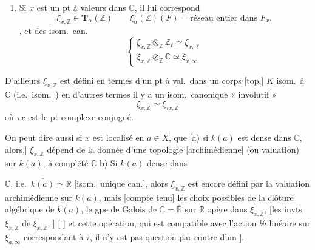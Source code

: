 \documentclass[11pt,a4paper]{article}
\begin{document}
\begin{enumerate}
  \item[(iv)] Si $x$ est un pt à valeurs dans $\mathbb{C}$, il lui
  correspond
  \[
    \xi_{x,\mathbb{Z}} \in \mathbf{T}_\alpha(\mathbb{Z}) \qquad
    \xi_\alpha(\mathbb{Z})(F) = \text{réseau entier dans } F_x ,
  \]
   
  , et des isom.\ can.
  \[
    \begin{cases}
      \xi_{x,\mathbb{Z}} \otimes_{\mathbb{Z}} \mathbb{Z}_\ell \simeq
      \xi_{x,\ell} \\
      \xi_{x,\mathbb{Z}} \otimes_{\mathbb{Z}} \mathbb{C} \simeq
      \xi_{x,\infty}
    \end{cases}
  \]
\end{enumerate}

D'ailleurs $\xi_{x,\mathbb{Z}}$ est défini en termes d'un pt à val.\ dans
un corps [top.] $K$ isom.\ à $\mathbb{C}$ (i.e.\ isom.\ \ill{}) en d'autres
termes il y a un isom.\ canonique « involutif »
\[
  \xi_{x,\mathbb{Z}} \simeq \xi_{\tau x,\mathbb{Z}}
\]
où $\tau x$ est le pt complexe conjugué.

 On peut dire aussi si $x$ est localisé en $a \in X$, que [a)
si $k(a)$ est dense dans $\mathbb{C}$, alors,] $\xi_{x,\mathbb{Z}}$ dépend
de la donnée d'une topologie [archimédienne] (ou valuation) sur $k(a)$, à
complété $\mathbb{C}$ \quad b) Si $k(a)$ \ill{} dense dans

$\mathbb{C}$, i.e.\ $\overline{k(a)} \simeq \mathbb{R}$ [isom.\ unique
can.], alors $\xi_{x,\mathbb{Z}}$ est encore défini par la valuation
archimédienne sur $k(a)$, mais  [compte tenu] 
les choix possibles de la clôture algébrique de $k(a)$, le gpe de Galois de
$\mathbb{C} = \overline{\mathbb{R}}$ sur $\mathbb{R}$ opère dans
$\xi_{x,\mathbb{Z}}$, \ill{} [les invts \ill{} $\xi_{x,\mathbb{Z}}$ \ill{}
de $\xi_{x,\mathbb{Z}}$, \ill{}] [\ill{} \ill{}] et cette opération, qui
est compatible avec \ill{} l'action ½ linéaire sur $\xi_{\bar{a},\infty}$
correspondant à $\tau$, il n'y est pas question par contre d'un
].

\end{document}
